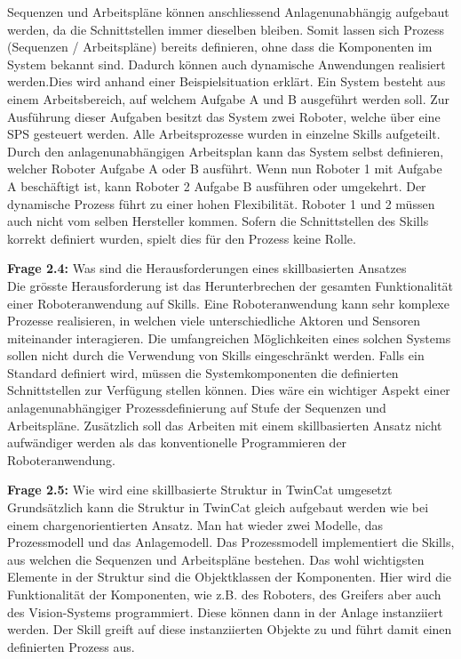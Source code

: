 		Sequenzen und Arbeitspläne können anschliessend Anlagenunabhängig aufgebaut werden, da die Schnittstellen immer dieselben bleiben. Somit lassen sich Prozess (Sequenzen / Arbeitspläne) bereits definieren, ohne dass die Komponenten im System bekannt sind. Dadurch können auch dynamische Anwendungen realisiert werden.Dies wird anhand einer Beispielsituation erklärt. Ein System besteht aus einem Arbeitsbereich, auf welchem Aufgabe A und B ausgeführt werden soll.  
		Zur Ausführung dieser Aufgaben besitzt das System zwei Roboter, welche über eine SPS gesteuert werden. Alle Arbeitsprozesse wurden in einzelne Skills aufgeteilt. Durch den anlagenunabhängigen Arbeitsplan kann das System selbst definieren, welcher Roboter Aufgabe A oder B ausführt. Wenn nun Roboter 1 mit Aufgabe A beschäftigt ist, kann Roboter 2 Aufgabe B ausführen oder umgekehrt. Der dynamische Prozess führt zu einer hohen Flexibilität. Roboter 1 und 2 müssen auch nicht vom selben Hersteller kommen. Sofern die Schnittstellen des Skills korrekt definiert wurden, spielt dies für den Prozess keine Rolle. 
	
	\vspace{3mm}
	
	\textbf{Frage 2.4:} Was sind die Herausforderungen eines skillbasierten Ansatzes \vspace{2mm} 
	\\
		Die grösste Herausforderung ist das Herunterbrechen der gesamten Funktionalität einer Roboteranwendung auf Skills. Eine Roboteranwendung kann sehr komplexe Prozesse realisieren, in welchen viele unterschiedliche Aktoren und Sensoren miteinander interagieren. Die umfangreichen Möglichkeiten eines solchen Systems sollen nicht durch die Verwendung von Skills eingeschränkt werden. Falls ein Standard definiert wird, müssen die Systemkomponenten die definierten Schnittstellen zur Verfügung stellen können. Dies wäre ein wichtiger Aspekt einer anlagenunabhängiger Prozessdefinierung auf Stufe der Sequenzen und Arbeitspläne. Zusätzlich soll das Arbeiten mit einem skillbasierten Ansatz nicht aufwändiger werden als das konventionelle Programmieren der Roboteranwendung. 
	\vspace{3mm}
	
	\textbf{Frage 2.5:} Wie wird eine skillbasierte Struktur in TwinCat umgesetzt \vspace{2mm} 
	\\
		Grundsätzlich kann die Struktur in TwinCat gleich aufgebaut werden wie bei einem chargenorientierten Ansatz. Man hat wieder zwei Modelle, das Prozessmodell und das Anlagemodell. Das Prozessmodell implementiert die Skills, aus welchen die Sequenzen und Arbeitspläne bestehen. Das wohl wichtigsten Elemente in der Struktur sind die Objektklassen der Komponenten. Hier wird die Funktionalität der Komponenten, wie z.B. des Roboters, des Greifers aber auch des Vision-Systems programmiert. Diese können dann in der Anlage instanziiert werden. Der Skill greift auf diese instanziierten Objekte zu und führt damit einen definierten Prozess aus. 
	
